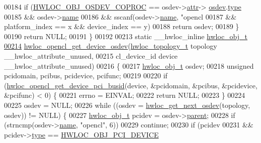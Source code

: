 \begin{DoxyCode}
{00184                 \textcolor{keywordflow}{if} (\hyperlink{a00184_gga64f5d539df299c97ae80ce53fc4b56c0a46f8927e1c3e137eaa86cc8f6861fb83}{HWLOC\_OBJ\_OSDEV\_COPROC} == osdev->\hyperlink{a00238_accd40e29f71f19e88db62ea3df02adc8}{attr}->
      \hyperlink{a00242_a22904c25fe44b323bab5c9bc52660fca}{osdev}.\hyperlink{a00282_a31e019e27e54ac6138d04be639bb96f9}{type}
00185                     && osdev->\hyperlink{a00238_abb709ec38f2970677e4e57d1d30be96d}{name}
00186                     && sscanf(osdev->\hyperlink{a00238_abb709ec38f2970677e4e57d1d30be96d}{name}, \textcolor{stringliteral}{"opencl%
00187                     && platform\_index == x && device\_index == y)
00188                         \textcolor{keywordflow}{return} osdev;
00189         \}
00190         \textcolor{keywordflow}{return} NULL;
00191 \}
00192 
00213 \textcolor{keyword}{static} \_\_hwloc\_inline \hyperlink{a00238}{hwloc\_obj\_t}
\hyperlink{a00218_gadabfa6516aa12e5d8f79b9b4dd9f3cf8}{00214} \hyperlink{a00218_gadabfa6516aa12e5d8f79b9b4dd9f3cf8}{hwloc\_opencl\_get\_device\_osdev}(\hyperlink{a00186_ga9d1e76ee15a7dee158b786c30b6a6e38}{hwloc\_topology\_t} topology 
      \_\_hwloc\_attribute\_unused,
00215                               cl\_device\_id device \_\_hwloc\_attribute\_unused)
00216 \{
00217         \hyperlink{a00238}{hwloc\_obj\_t} osdev;
00218         \textcolor{keywordtype}{unsigned} pcidomain, pcibus, pcidevice, pcifunc;
00219 
00220         \textcolor{keywordflow}{if} (\hyperlink{a00218_gab89e4d20f8a353299351b41849e35ac9}{hwloc\_opencl\_get\_device\_pci\_busid}(device, &pcidomain, &pcibus,
       &pcidevice, &pcifunc) < 0) \{
00221                 errno = EINVAL;
00222                 \textcolor{keywordflow}{return} NULL;
00223         \}
00224 
00225         osdev = NULL;
00226         \textcolor{keywordflow}{while} ((osdev = \hyperlink{a00204_ga8b4584c8949e2c5f1c97ba7fe92b8145}{hwloc\_get\_next\_osdev}(topology, osdev)) != NULL) \{
00227                 \hyperlink{a00238}{hwloc\_obj\_t} pcidev = osdev->\hyperlink{a00238_adc494f6aed939992be1c55cca5822900}{parent};
00228                 \textcolor{keywordflow}{if} (strncmp(osdev->\hyperlink{a00238_abb709ec38f2970677e4e57d1d30be96d}{name}, \textcolor{stringliteral}{"opencl"}, 6))
00229                         \textcolor{keywordflow}{continue};
00230                 \textcolor{keywordflow}{if} (pcidev
00231                     && pcidev->\hyperlink{a00238_acc4f0803f244867e68fe0036800be5de}{type} == \hyperlink{a00184_ggacd37bb612667dc437d66bfb175a8dc55a5d8117a54df1fbd3606ab19e42cb0ea9}{HWLOC\_OBJ\_PCI\_DEVICE}
}}
\end{DoxyCode}
